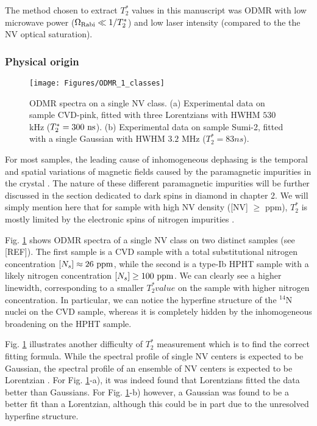 \documentclass[a4paper,11pt]{report}
\begin{document}
The method chosen to extract $T_2^*$ values in this manuscript was ODMR with low microwave power ($\Omega_{\rm Rabi} \ll 1/T_2^*$) and low laser intensity (compared to the the NV optical saturation).

\subsubsection{Physical origin}

\begin{figure}[h!]
\centering
\texttt{[image: Figures/ODMR\_1\_classes]}
\caption{ODMR spectra on a single NV class. (a) Experimental data on sample CVD-pink, fitted with three Lorentzians with HWHM $530$ kHz ($T_2^*=300\ \rm ns$). (b) Experimental data on sample Sumi-2, fitted with a single Gaussian with HWHM $3.2$ MHz ($T_2^*=83 ns$).}
\label{ODMR 1 classe}
\end{figure}

For most samples, the leading cause of inhomogeneous dephasing is the temporal and spatial variations of magnetic fields caused by the paramagnetic impurities in the crystal \citep{barry2020sensitivity}. The nature of these different paramagnetic impurities will be further discussed in the section dedicated to dark spins in diamond in chapter 2. We will simply mention here that for sample with high NV density ([NV] $\geq$ ppm), $T_2^*$ is mostly limited by the electronic spins of nitrogen impurities \citep{bauch2018ultralong}.

Fig. \ref{ODMR 1 classe} shows ODMR spectra of a single NV class on two distinct samples (see [REF]). The first sample is a CVD sample with a total substitutional nitrogen  concentration $[N_s] \approx 26\ \rm ppm$, while the second is a type-Ib HPHT sample with a likely nitrogen concentration $[N_s] \geq 100\ \rm ppm$. We can clearly see a higher linewidth, corresponding to a smaller $T_2^* value$ on the sample with higher nitrogen concentration. In particular, we can notice the hyperfine structure of the $^{14}$N nuclei on the CVD sample, whereas it is completely hidden by the inhomogeneous broadening on the HPHT sample.

Fig. \ref{ODMR 1 classe} illustrates another difficulty of $T_2^*$ measurement which is to find the correct fitting formula. While the spectral profile of single NV centers is expected to be Gaussian, the spectral profile of an ensemble of NV centers  is expected to be Lorentzian \citep{dobrovitski2008decoherence, hall2014analytic}. For Fig. \ref{ODMR 1 classe}-a), it was indeed found that Lorentzians fitted the data better than Gaussians. For Fig. \ref{ODMR 1 classe}-b) however, a Gaussian was found to be a better fit than a Lorentzian, although this could be in part due to the unresolved hyperfine structure.
\end{document}
